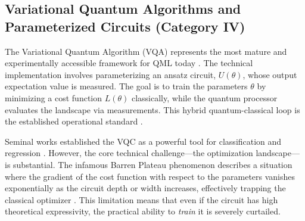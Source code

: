 \documentclass{article}
\begin{document}
\begin{table}[ht]
\centering
\caption{Performance comparison of different methods on Key Idea, Dataset/Benchmark, Performance (Reported), Limitations}
\label{tab:2}
\end{table}

\subsection{Variational Quantum Algorithms and Parameterized Circuits (Category IV)}

\label{sec:variational\_quantum\_algorithms\_and\_param}

The Variational Quantum Algorithm (VQA) represents the most mature and experimentally accessible framework for QML today \cite{cerezo2021variational}. The technical implementation involves parameterizing an ansatz circuit, $U(\theta)$, whose output expectation value is measured. The goal is to train the parameters $\theta$ by minimizing a cost function $L(\theta)$ classically, while the quantum processor evaluates the landscape via measurements. This hybrid quantum-classical loop is the established operational standard \cite{pulicharla2023hybrid}.

Seminal works established the VQC as a powerful tool for classification and regression \cite{piatrenka2022quantum}. However, the core technical challenge---the optimization landscape---is substantial. The infamous Barren Plateau phenomenon describes a situation where the gradient of the cost function with respect to the parameters vanishes exponentially as the circuit depth or width increases, effectively trapping the classical optimizer \cite{cerezo2021cost}. This limitation means that even if the circuit has high theoretical expressivity, the practical ability to \textit{train} it is severely curtailed.
\end{document}
